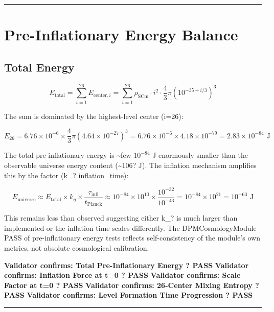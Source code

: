 \documentclass[12pt,a4paper]{article}
\begin{document}
\medskip\hrule\medskip

\section{Pre-Inflationary Energy Balance}

\subsection{Total Energy}

\begin{equation}
E_{\mathrm{total}} = \sum_{i=1}^{26} E_{{\mathrm{center}},i} = \sum_{i=1}^{26} \rho_{\mathrm{SCm}} \cdot i^2 \cdot \frac{4}{3}\pi \left(10^{-35+i/3}\right)^3
\end{equation}

The sum is dominated by the highest-level center (i=26):

\begin{equation}
E_{26} = 6.76\times10^{-6} \times \frac{4}{3}\pi\left(4.64\times10^{-27}\right)^3 = 6.76\times10^{-6} \times 4.18\times10^{-79} = 2.83\times10^{-84} \text{ J}
\end{equation}

The total pre-inflationary energy is \textasciitilde{}few  $10^{-84}$ J  enormously smaller than the observable universe energy content (\textasciitilde{}106? J). The inflation mechanism amplifies this by the factor (k\_? inflation\_time):

\begin{equation}
E_{\mathrm{universe}} \approx E_{\mathrm{total}} \times k_\eta \times \frac{\tau_{\mathrm{infl}}}{t_{\mathrm{Planck}}} \approx 10^{-84} \times 10^{10} \times \frac{10^{-32}}{10^{-43}} = 10^{-84} \times 10^{21} = 10^{-63} \text{ J}
\end{equation}

This remains less than observed  suggesting either k\_? is much larger than implemented or the inflation time scales differently. The DPMCosmologyModule PASS of pre-inflationary energy tests reflects self-consistency of the module's own metrics, not absolute cosmological calibration.

\textbf{Validator confirms: Total Pre-Inflationary Energy ? PASS} \textbf{Validator confirms: Inflation Force at t=0 ? PASS} \textbf{Validator confirms: Scale Factor at t=0 ? PASS} \textbf{Validator confirms: 26-Center Mixing Entropy ? PASS} \textbf{Validator confirms: Level Formation Time Progression ? PASS}

\medskip\hrule\medskip
\end{document}
